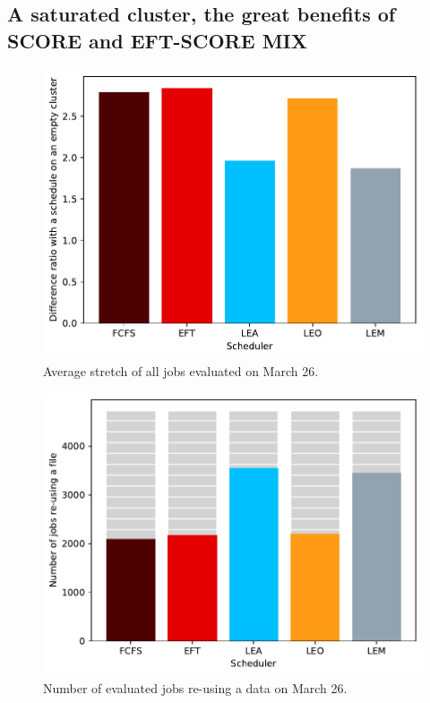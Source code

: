 \documentclass[conference,10pt]{IEEEtran}
\begin{document}

\subsection{A saturated cluster, the great benefits of SCORE and EFT-SCORE MIX}

\begin{figure}[tb]\centering\includegraphics[scale=0.47]{../MBSS/plot/Results_FCFS_Score_Backfill_2022-03-26->2022-03-26_V10000_Mean_Stretch_450_128_32_256_4_1024.pdf}\caption{Average stretch of all jobs evaluated on March 26.}\end{figure}
\begin{figure}[tb]\centering\includegraphics[scale=0.47]{../MBSS/plot/Results_FCFS_Score_Backfill_2022-03-26->2022-03-26_V10000_Number_of_data_reuse_450_128_32_256_4_1024.pdf}\caption{Number of evaluated jobs re-using a data on March 26.}\end{figure}
\end{document}
